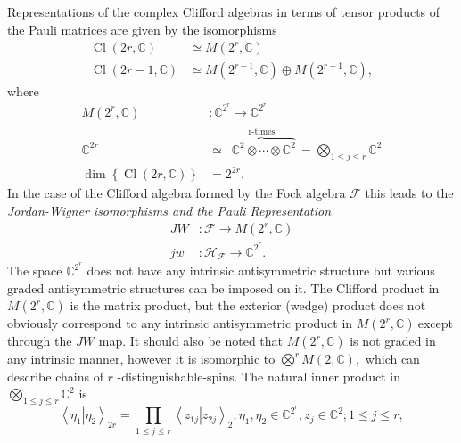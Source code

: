 \documentclass[aps,preprint]{revtex4}%
\begin{document}
Representations of the complex Clifford algebras in terms of tensor products
of the Pauli matrices are given by the isomorphisms
\begin{align}
\operatorname*{Cl}\left(  2r,\mathbb{C}\right)   &  \simeq M\left(
2^{r},\mathbb{C}\right)  \\
\operatorname*{Cl}\left(  2r-1,\mathbb{C}\right)   &  \simeq M\left(
2^{r-1},\mathbb{C}\right)  \oplus M\left(  2^{r-1},\mathbb{C}\right)  ,
\end{align}
where
\begin{align}
M\left(  2^{r},\mathbb{C}\right)   &  :\mathbb{C}^{2^{r}}\rightarrow
\mathbb{C}^{2^{r}}\\
\mathbb{C}^{2r} &  \simeq\,\overset{\text{r-times}}{\overbrace{\,\,\mathbb{C}%
^{2}\otimes\cdots\otimes\mathbb{C}^{2}}}\,=%
{\textstyle\bigotimes_{1\leq j\leq r}}
\mathbb{C}^{2}\\
\dim\left\{  \operatorname*{Cl}\left(  2r,\mathbb{C}\right)  \right\}   &
=2^{2r}.
\end{align}
In the case of the Clifford algebra formed by the Fock algebra $\mathcal{F}$
this leads to the \emph{Jordan-Wigner isomorphisms and the Pauli
Representation }%
\begin{align}
JW &  :\mathcal{F}\longrightarrow M\left(  2^{r},\mathbb{C}\right)  \\
jw &  :\mathcal{H}_{\mathcal{F}}\longrightarrow\mathbb{C}^{2^{r}}.
\end{align}
The space $\mathbb{C}^{2^{r}}$ does not have any intrinsic antisymmetric
structure but various graded antisymmetric structures can be imposed on it.
The Clifford product in $M\left(  2^{r},\mathbb{C}\right)  $ is the matrix
product, but the exterior (wedge) product does not obviously correspond to any
intrinsic antisymmetric product in $M\left(  2^{r},\mathbb{C}\right)
\mathbb{\ }$except through the $JW$ map$.$ It should also be noted that
$M\left(  2^{r},\mathbb{C}\right)  $ is not graded in any intrinsic manner,
however it is isomorphic to $%
{\displaystyle\bigotimes\limits^{r}}
M\left(  2,\mathbb{C}\right)  ,$ which can describe chains of $r$%
-distinguishable-spins. The natural inner product in $%
{\textstyle\bigotimes\limits_{1\leq j\leq r}}
\mathbb{C}^{2}$ is
\begin{equation}
\left\langle \left.  \eta_{1}\right\vert \eta_{2}\right\rangle _{2r}=%
{\textstyle\prod_{1\leq j\leq r}}
\left\langle \left.  z_{1j}\right\vert z_{2j}\right\rangle _{2};\eta_{1}%
,\eta_{2}\in\mathbb{C}^{2^{r}},z_{j}\in\mathbb{C}^{2};1\leq j\leq r,
\end{equation}
\end{document}
